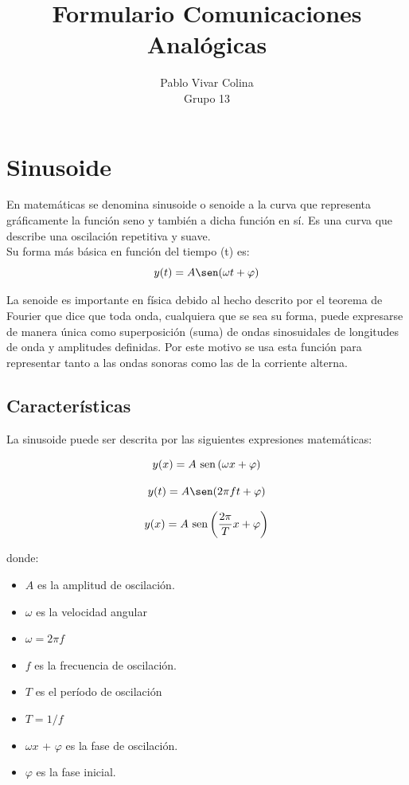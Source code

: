 \documentclass{article}
\title{Formulario Comunicaciones Analógicas}
\author{Pablo Vivar Colina\\
Grupo 13
}
\begin{document}
\maketitle

\section{Sinusoide}

En matemáticas se denomina sinusoide o senoide a la curva que representa gráficamente la función seno y también a dicha función en sí. Es una curva que describe una oscilación repetitiva y suave.\\

Su forma más básica en función del tiempo (t) es:\citep{Sinusoide}\\

\begin{equation}
    y(t) = A\sen(\omega t + \varphi)
\end{equation}

La senoide es importante en física debido al hecho descrito por el teorema de Fourier que dice que toda onda, cualquiera que se sea su forma, puede expresarse de manera única como superposición (suma) de ondas sinosuidales de longitudes de onda y amplitudes definidas. Por este motivo se usa esta función para representar tanto a las ondas sonoras como las de la corriente alterna.\citep{Sinusoide}\\

\subsection{Características}

La sinusoide puede ser descrita por las siguientes expresiones matemáticas:

\begin{equation}
y(x) = A\ {\rm{sen}}\left (\omega x + \varphi \right )
\end{equation}

\begin{equation}
y(t) = A\sen(2 \pi f t + \varphi)
\end{equation}


\begin{equation}
y(x) = A\ {\rm{sen}} \left (\frac {2\pi }{T}x + \varphi \right )
\end{equation}

donde:\\

\begin{itemize}
    \item $A$ es la amplitud de oscilación.
 \item $\omega$ es la velocidad angular  \item $\omega = 2\pi f$
  \item $f$ es la frecuencia de oscilación.
  \item $T$ es el período de oscilación  \item  $T = {1}/{f}$
 \item $\omega x$ + $\varphi$ es la fase de oscilación.
   \item $\varphi$ es la fase inicial.
\end{itemize}
\end{document}
